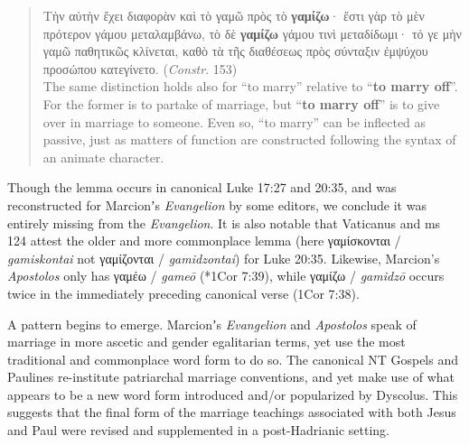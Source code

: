 \vspace*{3mm} 
 \begin{quote}Τὴν αὐτὴν ἔχει διαφορὰν καὶ τὸ γαμῶ πρὸς τὸ \textbf{γαμίζω}· %
 ἔστι γὰρ τὸ μὲν πρότερον γάμου μεταλαμβάνω, τὸ δὲ %
 \textbf{γαμίζω} γάμου τινὶ μεταδίδωμι· τό γε μὴν γαμῶ παθητικῶς κλίνεται, %
 καθὸ τὰ τῆς διαθέσεως πρὸς σύνταξιν ἐμψύχου προσώπου κατεγίνετο. (\textit{Constr}. 153) \\[1mm]
 The same distinction holds also for “to marry” relative to “\textbf{to marry off}”. %
 For the former is to partake of marriage, %
 but “\textbf{to marry off}” is to give over in marriage to someone. %
 Even so, “to marry” can be inflected as passive, %
 just as matters of function are constructed following the syntax of an animate character. %
 \end{quote} %
 \vspace*{3mm}

Though the lemma occurs in canonical Luke 17:27 and 20:35, %
and was reconstructed for Marcionʼs \textit{Evangelion} by some editors, %
we conclude it was entirely missing from the \textit{Evangelion}. %
It is also notable that Vaticanus and ms 124 attest the older and more commonplace lemma (here γαμίσκονται / \textit{gamiskontai} not %
γαμίζονται / \textit{gamidzontai}) for Luke 20:35. 
Likewise, Marcion's \textit{Apostolos} only has γαμέω / %
\textit{gameō} (*1Cor 7:39), %
while γαμίζω / \textit{gamidzō} occurs twice in the immediately preceding canonical verse (1Cor 7:38). %

A pattern begins to emerge. Marcionʼs \textit{Evangelion} and \textit{Apostolos} %
speak of marriage in more ascetic and gender egalitarian terms, %
yet use the most traditional and commonplace word form to do so. %
The canonical NT Gospels and Paulines re-institute patriarchal marriage conventions, %
and yet make use of what appears to be a new word form introduced and/or popularized by Dyscolus. %
This suggests that the final form of the marriage teachings associated with both Jesus and Paul %
were revised and supplemented in a post-Hadrianic setting. \\[1.5mm] %

